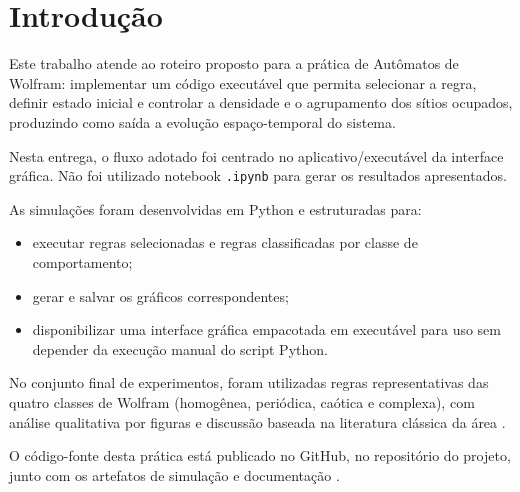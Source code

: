\chapter{Introdução}
\label{chap_introducao}

Este trabalho atende ao roteiro proposto para a prática de Autômatos de Wolfram: implementar um código executável que permita selecionar a regra, definir estado inicial e controlar a densidade e o agrupamento dos sítios ocupados, produzindo como saída a evolução espaço-temporal do sistema.

Nesta entrega, o fluxo adotado foi centrado no aplicativo/executável da interface gráfica. Não foi utilizado notebook \texttt{.ipynb} para gerar os resultados apresentados.

As simulações foram desenvolvidas em Python e estruturadas para:
\begin{itemize}
\item executar regras selecionadas e regras classificadas por classe de comportamento;
\item gerar e salvar os gráficos correspondentes;
\item disponibilizar uma interface gráfica empacotada em executável para uso sem depender da execução manual do script Python.
\end{itemize}

No conjunto final de experimentos, foram utilizadas regras representativas das quatro classes de Wolfram (homogênea, periódica, caótica e complexa), com análise qualitativa por figuras e discussão baseada na literatura clássica da área \cite{wolfram1983,wolfram2002,mathworldECA,wikipediaECA}.

O código-fonte desta prática está publicado no GitHub, no repositório do projeto, junto com os artefatos de simulação e documentação \cite{githubProjetoWolfram}.
